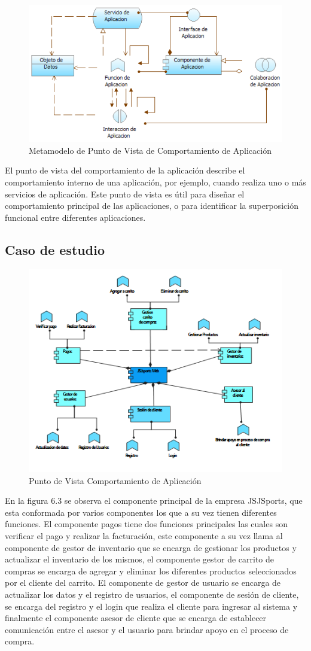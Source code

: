 \begin{figure}[th!]
	\centering
	\includegraphics[width=0.5\linewidth]{arquitectura/imagenes/modeloComportamientoAplicacion}
	\caption{Metamodelo de Punto de Vista de Comportamiento de Aplicación \cite{pun7}}
	\label{fig:metamodelo de punto de vista de comportamiento de aplicación}
\end{figure}
El punto de vista del comportamiento de la aplicación describe el comportamiento interno de una aplicación, por ejemplo, cuando realiza uno o más servicios de aplicación. Este punto de vista es útil para diseñar el comportamiento principal de las aplicaciones, o para identificar la superposición funcional entre diferentes aplicaciones.

\subsection{Caso de estudio}
\begin{figure}[th!]
	\centering
	\includegraphics[width=0.6\linewidth]{arquitectura/imagenes/VistaComportamientoAplicacion}
	\caption{Punto de Vista Comportamiento de Aplicación}
	\label{fig:vistacomportamientoaplicacion}
\end{figure}
En la figura 6.3 se observa el componente principal de la empresa JSJSports, que esta conformada por varios componentes los que a su vez tienen diferentes funciones.
\newline
El componente pagos tiene dos funciones principales las cuales son verificar el pago y	realizar la facturación, este componente a su vez llama al componente de gestor de inventario que se encarga de gestionar los productos y actualizar el inventario de los mismos, el componente gestor de carrito de compras se encarga de agregar y eliminar los diferentes productos seleccionados por el cliente del carrito.
El componente de gestor de usuario se encarga de actualizar los datos y el registro de usuarios, el componente de sesión de cliente, se encarga del registro y el login que realiza el cliente para ingresar al sistema y finalmente el componente asesor de cliente que se encarga de establecer comunicación entre el asesor y el usuario para brindar apoyo en el proceso de compra.
\newpage

